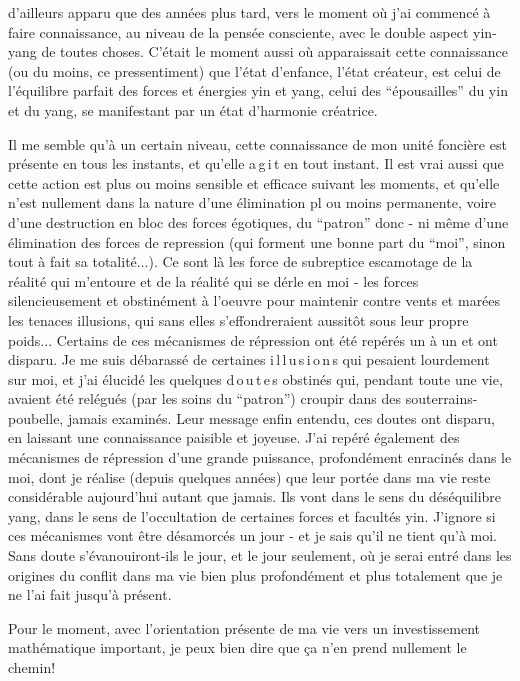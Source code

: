 d'ailleurs apparu que des années plus tard, vers le moment où j'ai commencé à faire connaissance, au niveau de la pensée consciente, avec le double aspect yin-yang de toutes choses. C'était le moment aussi où apparaissait cette connaissance (ou du moins, ce pressentiment) que l'état d'enfance, l'état créateur, est celui de l'équilibre parfait des forces et énergies yin et yang, celui des ``épousailles'' du yin et du yang, se manifestant par un état d'harmonie créatrice.

Il me semble qu'à un certain niveau, cette connaissance de mon unité foncière est présente en tous les instants, et qu'elle a\,g\,i\,t en tout instant. Il est vrai aussi que cette action est plus ou moins sensible et efficace suivant les moments, et qu'elle n'est nullement dans la nature d'une élimination pl ou moins permanente, voire d'une destruction en bloc des forces égotiques, du ``patron'' donc - ni même d'une élimination des forces de repression (qui forment une bonne part du ``moi'', sinon tout à fait sa totalité...). Ce sont là les force de subreptice escamotage de la réalité qui m'entoure et de la réalité qui se dérle en moi - les forces silencieusement et obstinément à l'oeuvre pour maintenir contre vents et marées les tenaces illusions, qui sans elles s'effondreraient aussitôt sous leur propre poids... Certains de ces mécanismes de répression ont été repérés un à un et ont disparu. Je me suis débarassé de certaines i\,l\,l\,u\,s\,i\,o\,n\,s qui pesaient lourdement sur moi, et j'ai élucidé les quelques d\,o\,u\,t\,e\,s obstinés qui, pendant toute une vie, avaient été relégués (par les soins du ``patron'') croupir dans des souterrains-poubelle, jamais examinés. Leur message enfin entendu, ces doutes ont disparu, en laissant une connaissance paisible et joyeuse. J'ai repéré également des mécanismes de répression d'une grande puissance, profondément enracinés dans le moi, dont je réalise (depuis quelques années) que leur portée dans ma vie reste considérable aujourd'hui autant que jamais. Ils vont dans le sens du déséquilibre yang, dans le sens de l'occultation de certaines forces et facultés yin. J'ignore si ces mécanismes vont être désamorcés un jour - et je sais qu'il ne tient qu'à moi. Sans doute s'évanouiront-ils le jour, et le jour seulement, où je serai entré dans les origines du conflit \unsure{:|{}} dans ma vie bien plus profondément et plus totalement que je ne l'ai fait jusqu'à présent.

Pour le moment, avec l'orientation présente de ma vie vers un investissement mathématique important, je peux bien dire que ça n'en prend nullement le chemin!
